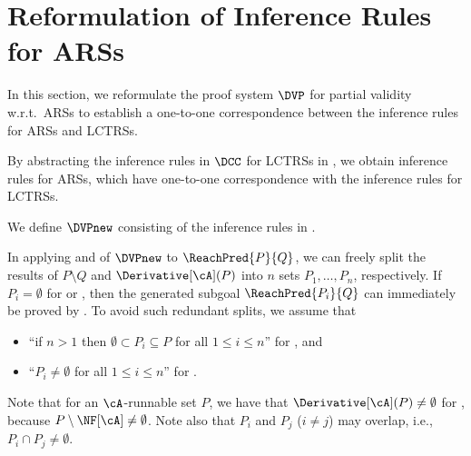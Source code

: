 \section{Reformulation of Inference Rules for ARSs}
\label{sec:all-path-reachability-for-ARSs}

In this section, we reformulate the proof system $\DVP$ for partial validity w.r.t.\ ARSs to establish a one-to-one correspondence between the inference rules for ARSs and LCTRSs.



By abstracting the inference rules in $\DCC$ for LCTRSs in , we obtain inference rules for ARSs, which have one-to-one correspondence with the inference rules for LCTRSs.

\begin{definition}[$\DVPnew$]
	\label{def:DVPnew}
	We define $\DVPnew$ consisting of the inference rules in .
\end{definition}
In applying  and  of $\DVPnew$ to $\ReachPred{P}{Q}$, we can freely split the results of $P \setminus Q$ and $\Derivative[\cA](P)$ into $n$ sets $P_1,\ldots,P_n$, respectively.
If $P_i=\emptyset$ for  or , then the generated subgoal $\ReachPred{P_i}{Q}$ can immediately be proved by .
To avoid such redundant splits, we assume that
\begin{itemize}
	\item ``if $n > 1$ then
	      $\emptyset \subset P_i \subseteq P$ for all $1 \leq i \leq n$'' for ,
	      and
	\item ``$P_i \ne \emptyset$ for all $1 \leq i \leq n$'' for .
\end{itemize}
Note that for an $\cA$-runnable set $P$, we have that $\Derivative[\cA](P)\ne\emptyset$ for , because
$P \setminus \NF[\cA]  \ne \emptyset$.
Note also that $P_i$ and $P_j$ ($i \ne j$) may overlap, i.e., $P_i \cap P_j \ne \emptyset$.

